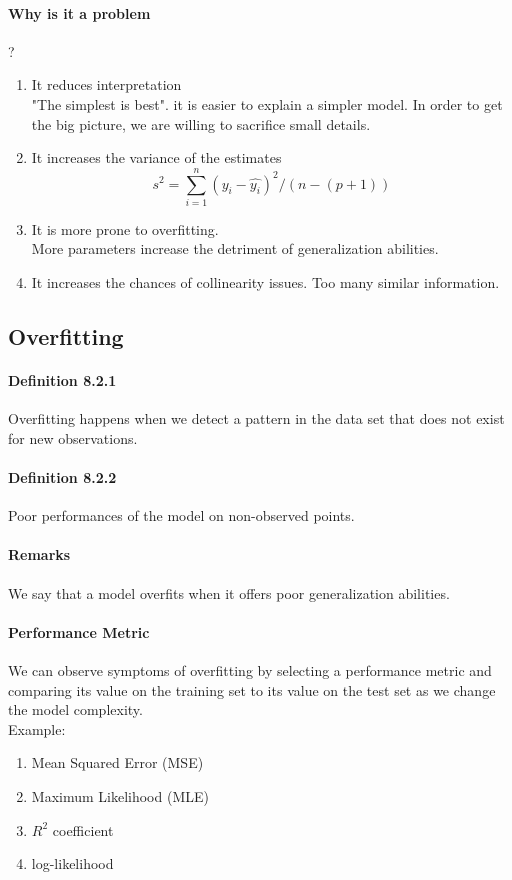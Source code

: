 \documentclass[11pt]{article}
\begin{document}
\paragraph{Why is it a problem}?
\begin{enumerate}
	\item It reduces interpretation \\
	"The simplest is best". it is easier to explain a simpler model. In order to get the big picture, we are willing to sacrifice small details.
	\item It increases the variance of the estimates
	$$ s^2 = \sum_{i=1}^n (y_i - \hat{y_i})^2 / (n- (p+1))$$
	\item It is more prone to overfitting.\\
	More parameters increase the detriment of generalization abilities.
	\item It increases the chances of collinearity issues. 
	Too many similar information.
\end{enumerate}
\subsection{Overfitting}
\paragraph{Definition 8.2.1}
Overfitting happens when we detect a pattern in the data set that does not exist for new observations.
\paragraph{Definition 8.2.2}
Poor performances of the model on non-observed points.
\paragraph{Remarks}
We say that a model overfits when it offers poor generalization abilities. 
\paragraph{Performance Metric}
We can observe symptoms of overfitting by selecting a performance metric and comparing its value on the training set to its value on the test set as we change the model complexity.\\
Example:
\begin{enumerate}
	\item Mean Squared Error (MSE)
	\item Maximum Likelihood (MLE)
	\item $R^2$ coefficient
	\item log-likelihood
\end{enumerate} 
\end{document}
